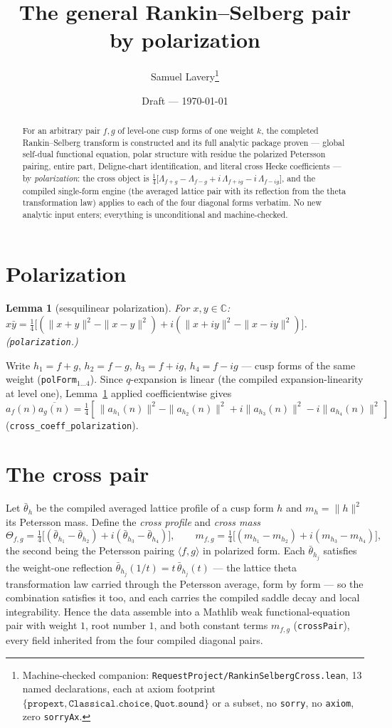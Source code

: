 \documentclass[11pt]{article}
\title{The general Rankin--Selberg pair by polarization}
\author{Samuel Lavery\thanks{Machine-checked companion:
\texttt{RequestProject/RankinSelbergCross.lean}, 13 named declarations, each at axiom
footprint $\{\texttt{propext},\texttt{Classical.choice},\texttt{Quot.sound}\}$ or a subset,
no \texttt{sorry}, no \texttt{axiom}, zero \texttt{sorryAx}.}}
\date{Draft --- \today}
\newtheorem{lemma}[theorem]{Lemma}
\begin{document}
\maketitle

\begin{abstract}
For an arbitrary pair $f, g$ of level-one cusp forms of one weight $k$, the completed
Rankin--Selberg transform is constructed and its full analytic package proven --- global
self-dual functional equation, polar structure with residue the polarized Petersson
pairing, entire part, Deligne-chart identification, and literal cross Hecke coefficients
--- by \emph{polarization}: the cross object is
$\frac14\bigl[\Lambda_{f+g}-\Lambda_{f-g}+i\,\Lambda_{f+ig}-i\,\Lambda_{f-ig}\bigr]$, and
the compiled single-form engine (the averaged lattice pair with its reflection from the
theta transformation law) applies to each of the four diagonal forms verbatim.  No new
analytic input enters; everything is unconditional and machine-checked.
\end{abstract}

\section{Polarization}

\begin{lemma}[sesquilinear polarization]\label{lem:pol}
For $x,y\in\mathbb C$:
$x\bar y=\tfrac14\bigl[(\|x+y\|^2-\|x-y\|^2)+i(\|x+iy\|^2-\|x-iy\|^2)\bigr]$.
(\texttt{polarization}.)
\end{lemma}

Write $h_1=f+g$, $h_2=f-g$, $h_3=f+ig$, $h_4=f-ig$ --- cusp forms of the same weight
(\texttt{polForm}$_{1\ldots4}$).  Since $q$-expansion is linear
(the compiled expansion-linearity at level one), Lemma~\ref{lem:pol} applied
coefficientwise gives
$a_f(n)\overline{a_g(n)}
=\tfrac14[\,\|a_{h_1}(n)\|^2-\|a_{h_2}(n)\|^2+i\|a_{h_3}(n)\|^2-i\|a_{h_4}(n)\|^2\,]$
(\texttt{cross\_coeff\_polarization}).

\section{The cross pair}

Let $\bar\theta_h$ be the compiled averaged lattice profile of a cusp form $h$ and
$m_h=\|h\|^2$ its Petersson mass.  Define the \emph{cross profile} and \emph{cross mass}
\[
  \Theta_{f,g}=\tfrac14\bigl[(\bar\theta_{h_1}-\bar\theta_{h_2})
    +i(\bar\theta_{h_3}-\bar\theta_{h_4})\bigr],\qquad
  m_{f,g}=\tfrac14\bigl[(m_{h_1}-m_{h_2})+i(m_{h_3}-m_{h_4})\bigr],
\]
the second being the Petersson pairing $\langle f,g\rangle$ in polarized form.  Each
$\bar\theta_{h_j}$ satisfies the weight-one reflection
$\bar\theta_{h_j}(1/t)=t\,\bar\theta_{h_j}(t)$ --- the lattice theta transformation law
carried through the Petersson average, form by form --- so the combination satisfies it
too, and each carries the compiled saddle decay and local integrability.  Hence the data
assemble into a Mathlib weak functional-equation pair with weight $1$, root number $1$,
and both constant terms $m_{f,g}$ (\texttt{crossPair}), every field inherited from the
four compiled diagonal pairs.
\end{document}
